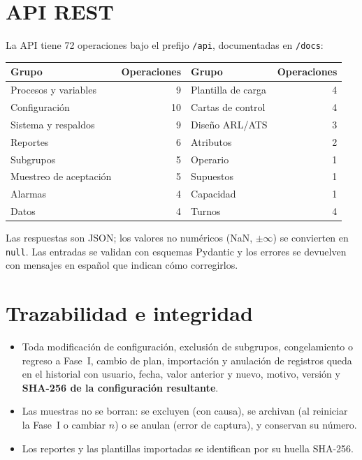 \documentclass[11pt,a4paper]{article}
\begin{document}
\section{API REST}

La API tiene 72 operaciones bajo el prefijo \texttt{/api}, documentadas en \texttt{/docs}:

\begin{center}
\begin{tabular}{@{}lr@{\qquad\qquad}lr@{}}
\toprule
\textbf{Grupo} & \textbf{Operaciones} & \textbf{Grupo} & \textbf{Operaciones}\\
\midrule
Procesos y variables & 9 & Plantilla de carga & 4\\
Configuración & 10 & Cartas de control & 4\\
Sistema y respaldos & 9 & Diseño ARL/ATS & 3\\
Reportes & 6 & Atributos & 2\\
Subgrupos & 5 & Operario & 1\\
Muestreo de aceptación & 5 & Supuestos & 1\\
Alarmas & 4 & Capacidad & 1\\
Datos & 4 & Turnos & 4\\
\bottomrule
\end{tabular}
\end{center}

Las respuestas son JSON; los valores no numéricos (NaN, $\pm\infty$) se convierten en
\texttt{null}. Las entradas se validan con esquemas Pydantic y los errores se devuelven con
mensajes en español que indican cómo corregirlos.

\section{Trazabilidad e integridad}
\begin{itemize}
\item Toda modificación de configuración, exclusión de subgrupos, congelamiento o regreso a
  Fase~I, cambio de plan, importación y anulación de registros queda en el historial con usuario,
  fecha, valor anterior y nuevo, motivo, versión y \textbf{SHA-256 de la configuración
  resultante}.
\item Las muestras no se borran: se excluyen (con causa), se archivan (al reiniciar la Fase~I o
  cambiar $n$) o se anulan (error de captura), y conservan su número.
\item Los reportes y las plantillas importadas se identifican por su huella SHA-256.
\end{itemize}
\end{document}
